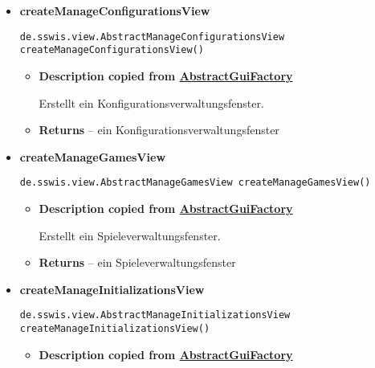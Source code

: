 {{{{{{{{{{\begin{itemize}
{\begin{itemize}
{Erstellt ein Strategieverwaltungsfenster für kombinierte Strategien.
}
\item{{\bf  Returns} -- 
ein Strategieverwaltungsfenster für kombinierte Strategien 
}%
\end{itemize}
}%
\item{ 
\hypertarget{de.sswis.controller.SwingGuiFactory.createManageConfigurationsView()}{{\bf  createManageConfigurationsView}\\}
\begin{lstlisting}[frame=none]
de.sswis.view.AbstractManageConfigurationsView createManageConfigurationsView()\end{lstlisting} %
\begin{itemize}
\item{
{\bf  Description copied from \hyperlink{de.sswis.controller.AbstractGuiFactory}{AbstractGuiFactory}{\small {}} }

Erstellt ein Konfigurationsverwaltungsfenster.
}
\item{{\bf  Returns} -- 
ein Konfigurationsverwaltungsfenster 
}%
\end{itemize}
}%
\item{ 
\hypertarget{de.sswis.controller.SwingGuiFactory.createManageGamesView()}{{\bf  createManageGamesView}\\}
\begin{lstlisting}[frame=none]
de.sswis.view.AbstractManageGamesView createManageGamesView()\end{lstlisting} %
\begin{itemize}
\item{
{\bf  Description copied from \hyperlink{de.sswis.controller.AbstractGuiFactory}{AbstractGuiFactory}{\small {}} }

Erstellt ein Spieleverwaltungsfenster.
}
\item{{\bf  Returns} -- 
ein Spieleverwaltungsfenster 
}%
\end{itemize}
}%
\item{ 
\hypertarget{de.sswis.controller.SwingGuiFactory.createManageInitializationsView()}{{\bf  createManageInitializationsView}\\}
\begin{lstlisting}[frame=none]
de.sswis.view.AbstractManageInitializationsView createManageInitializationsView()\end{lstlisting} %
\begin{itemize}
\item{
{\bf  Description copied from \hyperlink{de.sswis.controller.AbstractGuiFactory}{AbstractGuiFactory}{\small {}} }

}
\end{itemize}}
\end{itemize}}}}}}}}}}}
